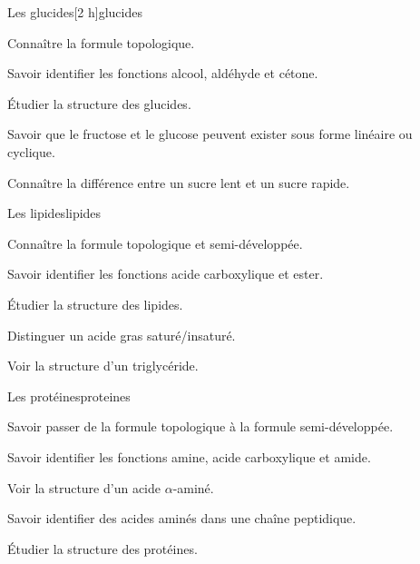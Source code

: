 \begin{multicols}{2}
  \begin{TP}{Les glucides}[2 h]{glucides}
    \begin{prerequis}
      \item Connaître la formule topologique.
      \item Savoir identifier les fonctions alcool, aldéhyde et cétone.
    \end{prerequis}
    \begin{objectifs}  
      \item Étudier la structure des glucides.
      \item Savoir que le fructose et le glucose peuvent exister sous forme linéaire ou cyclique.
      \item Connaître la différence entre un sucre lent et un sucre rapide.
    \end{objectifs}
  \end{TP}

  \begin{activite}{Les lipides}{lipides}
    \begin{prerequis}
      \item Connaître la formule topologique et semi-développée.
      \item Savoir identifier les fonctions acide carboxylique et ester.
    \end{prerequis}
    \begin{objectifs}
      \item Étudier la structure des lipides.
      \item Distinguer un acide gras saturé/insaturé.
      \item Voir la structure d'un triglycéride.
    \end{objectifs}
  \end{activite}

  \begin{activite}{Les protéines}{proteines}
    \begin{prerequis}
      \item Savoir passer de la formule topologique à la formule semi-développée.
      \item Savoir identifier les fonctions amine, acide carboxylique et amide.
    \end{prerequis}
    \begin{objectifs}
      \item Voir la structure d'un acide $\alpha$-aminé.
      \item Savoir identifier des acides aminés dans une chaîne peptidique.
      \item Étudier la structure des protéines.
    \end{objectifs}
  \end{activite}


\end{multicols}

